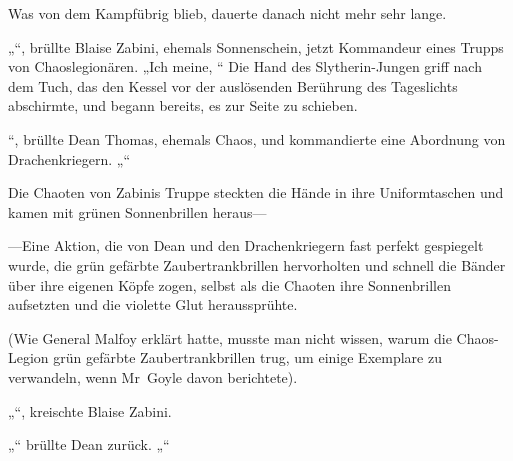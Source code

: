 Was von dem Kampfübrig blieb, dauerte danach nicht mehr sehr lange.

\later

„“, brüllte Blaise Zabini, ehemals Sonnenschein, jetzt Kommandeur eines Trupps von Chaoslegionären. „Ich meine, “ Die Hand des Slytherin-Jungen griff nach dem Tuch, das den Kessel vor der auslösenden Berührung des Tageslichts abschirmte, und begann bereits, es zur Seite zu schieben.

“, brüllte Dean Thomas, ehemals Chaos, und kommandierte eine Abordnung von Drachenkriegern. „“

Die Chaoten von Zabinis Truppe steckten die Hände in ihre Uniformtaschen und kamen mit grünen Sonnenbrillen heraus—

—Eine Aktion, die von Dean und den Drachenkriegern fast perfekt gespiegelt wurde, die grün gefärbte Zaubertrankbrillen hervorholten und schnell die Bänder über ihre eigenen Köpfe zogen, selbst als die Chaoten ihre Sonnenbrillen aufsetzten und die violette Glut heraussprühte.

(Wie General Malfoy erklärt hatte, musste man nicht wissen, warum die Chaos-Legion grün gefärbte Zaubertrankbrillen trug, um einige Exemplare zu verwandeln, wenn Mr~Goyle davon berichtete).

„“, kreischte Blaise Zabini.

„“ brüllte Dean zurück. „“

